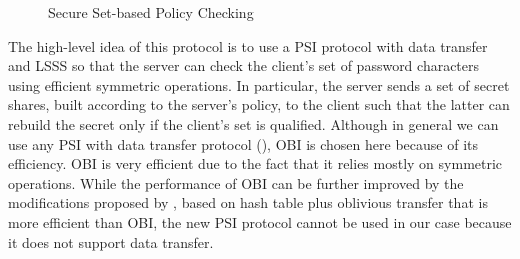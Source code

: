 \begin{figure*}[t]
\begin{center}
\end{center}
\caption{Secure Set-based Policy Checking}
\label{fig:spc}
\end{figure*}

\noindent
The high-level idea of this protocol is to use a \ac{PSI} protocol with data transfer and \ac{LSSS} so that the server can check the client's set of password characters using efficient symmetric operations.
In particular, the server sends a set of secret shares, built according to the server's policy, to the client such that the latter can rebuild the secret only if the client's set is qualified. 
Although in general we can use any \ac{PSI} with data transfer protocol (\eg \citet{fre04}), \ac{OBI} is chosen here because of its efficiency. 
\ac{OBI} is very efficient due to the fact that it relies mostly on symmetric operations. 
While the performance of \ac{OBI} can be further improved by the modifications proposed by \citet{Pinkas0Z14}, based on hash table plus oblivious transfer that is more efficient than \ac{OBI}, the new \ac{PSI} protocol cannot be used in our case because it does not support data transfer.

